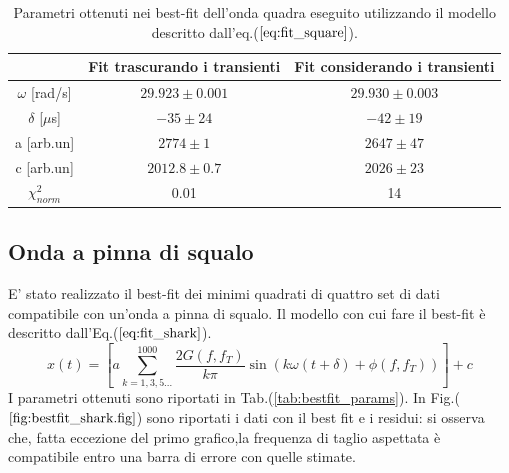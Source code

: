 \documentclass{article}
\begin{document}
            \begin{table}[H]
                \centering
                \begin{tabular}{ccc}
                    \hline
                     & Fit trascurando i transienti & Fit considerando i transienti \\
                    \hline
                    $\omega$ [rad/s]        & $29.923 \pm 0.001$    & $29.930\pm 0.003$ \\
                    $\delta$ [$\mu$s]       & $-35\pm 24$           & $-42\pm 19$ \\
                    a [arb.un]              & $2774 \pm 1$          & $2647 \pm 47$ \\
                    c [arb.un]              & $2012.8 \pm 0.7$      & $2026 \pm 23$ \\
                    $\chi^{2}_{norm}$ & 0.01 & 14 \\
                    \hline
                \end{tabular}
                \caption{Parametri ottenuti nei best-fit dell'onda quadra eseguito utilizzando il modello descritto dall'eq.($\ref{eq:fit_square}$).}
                \label{tab:bestfit_square}
            \end{table}
            

            
    \subsection{Onda a pinna di squalo}
        E' stato realizzato il best-fit dei minimi quadrati
        di quattro set di dati compatibile con un'onda a pinna di squalo.
        Il modello con cui fare il best-fit è descritto dall'Eq.($\ref{eq:fit_shark}$).
                \begin{equation}
                    x(t) = \left[a\sum_{k=1,3,5...}^{1000} \frac{2G(f,f_T)}{k\pi}\sin\left(k\omega (t+\delta)+\phi(f,f_T)\right)\right] +c
                    \label{eq:fit_shark}
                \end{equation} 
        I parametri ottenuti sono riportati in Tab.(\ref{tab:bestfit_params}).%
        In Fig.($\ref{fig:bestfit_shark.fig}$) sono riportati i dati con il best fit e 
        i residui: si osserva che, fatta eccezione del primo grafico,la frequenza di taglio aspettata è compatibile entro una 
        barra di errore con quelle stimate. 
\end{document}
